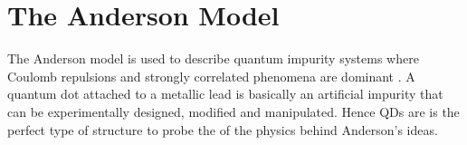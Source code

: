 






\section{The Anderson Model \label{sec:Anderson}}

 The Anderson model is used to describe quantum impurity systems where Coulomb repulsions and strongly correlated phenomena are dominant \citep{anderson_localized_1961}. A quantum dot attached to a metallic lead is basically an artificial impurity that can be experimentally designed, modified and manipulated. Hence QDs are is the perfect type of structure to probe the of the physics behind   Anderson's ideas.  

